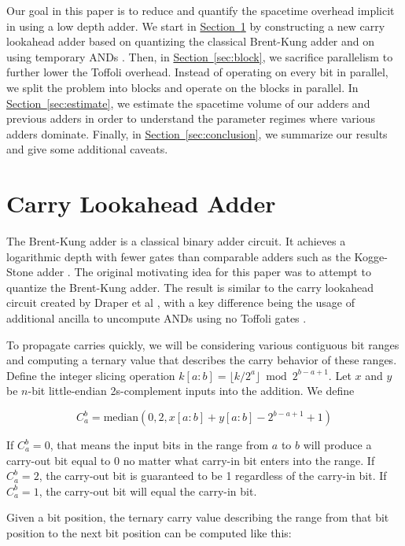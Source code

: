 \documentclass[onecolumn,unpublished]{quantumarticle}
\theoremstyle{definition}
\theoremstyle{definition}
\theoremstyle{definition}
\renewcommand{\sec}[1]{\hyperref[sec:#1]{Section~\ref*{sec:#1}}}
\begin{document}
Our goal in this paper is to reduce and quantify the spacetime overhead implicit in using a low depth adder.
We start in \sec{lookahead} by constructing a new carry lookahead adder based on quantizing the classical Brent-Kung adder \cite{brent1982adder} and on using temporary ANDs \cite{gidney2018halving}.
Then, in \sec{block}, we sacrifice parallelism to further lower the Toffoli overhead.
Instead of operating on every bit in parallel, we split the problem into blocks and operate on the blocks in parallel.
In \sec{estimate}, we estimate the spacetime volume of our adders and previous adders in order to understand the parameter regimes where various adders dominate.
Finally, in \sec{conclusion}, we summarize our results and give some additional caveats.


\section{Carry Lookahead Adder}
\label{sec:lookahead}

The Brent-Kung adder \cite{brent1982adder} is a classical binary adder circuit.
It achieves a logarithmic depth with fewer gates than comparable adders such as the Kogge-Stone adder \cite{kogge1973adder}.
The original motivating idea for this paper was to attempt to quantize the Brent-Kung adder.
The result is similar to the carry lookahead circuit created by Draper et al \cite{draper2004lookaheadadder}, with a key difference being the usage of additional ancilla to uncompute ANDs using no Toffoli gates \cite{gidney2018halving}.

To propagate carries quickly, we will be considering various contiguous bit ranges and computing a ternary value that describes the carry behavior of these ranges.
Define the integer slicing operation $k[a:b] = \lfloor k/2^a \rfloor \bmod 2^{b-a+1}$.
Let $x$ and $y$ be $n$-bit little-endian 2s-complement inputs into the addition.
We define

$$C_a^b = \text{median}(0, 2, x[a:b] + y[a:b] - 2^{b - a + 1} + 1)$$

If $C_a^b = 0$, that means the input bits in the range from $a$ to $b$ will produce a carry-out bit equal to 0 no matter what carry-in bit enters into the range.
If $C_a^b = 2$, the carry-out bit is guaranteed to be 1 regardless of the carry-in bit.
If $C_a^b = 1$, the carry-out bit will equal the carry-in bit.

Given a bit position, the ternary carry value describing the range from that bit position to the next bit position can be computed like this:
\end{document}
